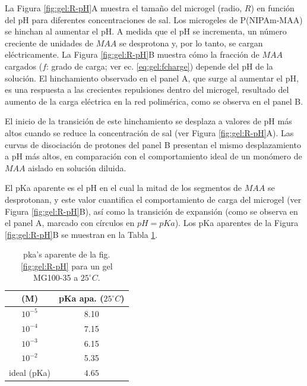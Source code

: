 La Figura \ref{fig:gel:R-pH}A muestra el tama\~no del microgel (radio, $R$) en funci\'on del pH para diferentes concentraciones de sal. Los microgeles de P(NIPAm-MAA) se hinchan al aumentar el pH. A medida que el pH se incrementa, un n\'umero creciente de unidades  de $MAA$ se desprotona y, por lo tanto, se cargan el\'ectricamente. La Figura \ref{fig:gel:R-pH}B muestra c\'omo la fracci\'on de $MAA$ cargados ($f$: grado de carga; ver ec. \ref{eq:gel:fcharge}) depende del pH de la soluci\'on. El hinchamiento observado en el panel A, que surge al aumentar el pH, es una respuesta a las crecientes repulsiones dentro del microgel, resultado del aumento de la carga el\'ectrica en la red polim\'erica, como se observa en el panel B.

El inicio de la transici\'on de este hinchamiento se desplaza a valores de pH m\'as altos cuando se reduce la concentraci\'on de sal (ver Figura \ref{fig:gel:R-pH}A). Las curvas de disociaci\'on de protones del panel B presentan el mismo desplazamiento a pH m\'as altos, en comparaci\'on con el comportamiento ideal de un mon\'omero de $MAA$ aislado en soluci\'on diluida.%

El pKa aparente es el pH en el cual la mitad de los segmentos de $MAA$ se desprotonan, y este valor cuantifica el comportamiento de carga del microgel (ver Figura \ref{fig:gel:R-pH}B), as\'i como la transici\'on de expansi\'on (como se observa en el panel A, marcado con c\'irculos en $pH=pKa$). Los pKa aparentes de la Figura \ref{fig:gel:R-pH}B se muestran en la Tabla \ref{table:gel:pKa_app}.





\begin{table}[!htb]
\centering
\small
  \begin{tabular}{|cc|}
    \hline
      [KCl] (M)&  pKa apa. ($25 ^\circ C$)  \\
      \hline
    $10^{-5}$ & 8.10  \\
    $10^{-4}$ & 7.15 \\
    $10^{-3}$ & 6.15 \\
    $10^{-2}$ & 5.35 \\
    ideal (pKa) &  $4.65$  \\
    \hline
  \end{tabular}
 \caption{ pka's aparente de la fig. \ref{fig:gel:R-pH} para un gel MG100-35 a $25 ^\circ C$.}
\label{table:gel:pKa_app} 
\end{table}


